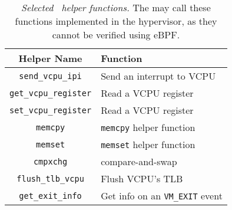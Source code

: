 \documentclass[11pt]{article}
\begin{document}

\begin{table}[t!]
 \centering
 \small
 \begin{tabular}{c|l}
 \textbf{Helper Name} & \textbf{Function} \\
 \hline
 \texttt{send\_vcpu\_ipi} & Send an interrupt to VCPU \\
 \texttt{get\_vcpu\_register} & Read a VCPU register\\
 \texttt{set\_vcpu\_register} & Read a VCPU register\\
 \texttt{memcpy} & \texttt{memcpy} helper function \\
 \texttt{memset} & \texttt{memset} helper function \\
 \texttt{cmpxchg} & compare-and-swap \\
 \texttt{flush\_tlb\_vcpu} & Flush VCPU's TLB \\
 \texttt{get\_exit\_info} &  Get info on an \texttt{VM\_EXIT} event
 \end{tabular}
 \caption{\emph{Selected \hypercallback~helper functions.} The \hypercallback{} may call these functions implemented in the hypervisor, as they cannot be verified using eBPF.}
\label{table:helpers}
 \end{table}
\end{document}
